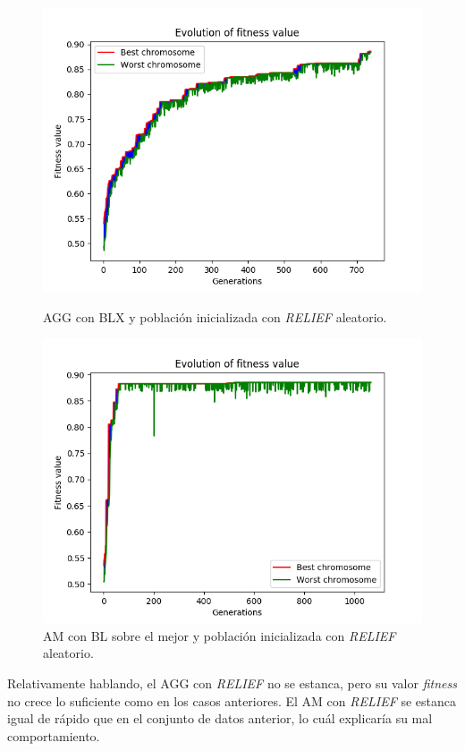 \documentclass[11pt,a4paper]{article}
\begin{document}
\begin{figure}[H]
\centering
\begin{minipage}{.5\textwidth}
	\centering
	\includegraphics[scale=0.43]{img/agg-blx-relief-texture.png}
	\caption{AGG con BLX y población inicializada con \textit{RELIEF} aleatorio.}
\end{minipage}%
\begin{minipage}{.5\textwidth}
	\centering
	\includegraphics[scale=0.43]{img/am-best-relief-texture.png}
	\caption{AM con BL sobre el mejor y población inicializada con \textit{RELIEF} aleatorio.}
\end{minipage}
\end{figure}

Relativamente hablando, el AGG con \textit{RELIEF} no se estanca, pero su valor \textit{fitness} no crece lo suficiente como
en los casos anteriores. El AM con \textit{RELIEF} se estanca igual de rápido que en el conjunto de datos anterior, lo cuál
explicaría su mal comportamiento.
\end{document}
